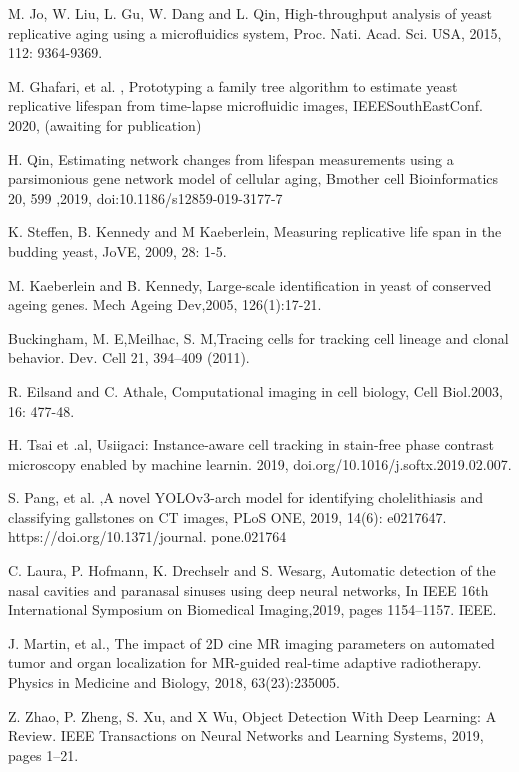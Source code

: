 \documentclass[conference]{IEEEtran}
\begin{document}
\begin{thebibliography}{00}
M. Jo, W. Liu, L. Gu, W. Dang and  L. Qin, High-throughput analysis of yeast replicative aging using a microfluidics system, Proc. Nati. Acad. Sci. USA, 2015, 112: 9364-9369.

M. Ghafari,  et al. , Prototyping a family tree algorithm to estimate yeast replicative lifespan from time-lapse microfluidic images, IEEESouthEastConf. 2020, (awaiting for publication)

H. Qin, Estimating network changes from lifespan measurements using a parsimonious gene network model of cellular aging, Bmother cell Bioinformatics 20, 599 ,2019, doi:10.1186/s12859-019-3177-7

K. Steffen, B. Kennedy and M Kaeberlein, Measuring replicative life span in the budding yeast, JoVE, 2009,  28: 1-5.

M. Kaeberlein and B. Kennedy, Large-scale identification in yeast of conserved ageing genes. Mech Ageing Dev,2005, 126(1):17-21.

Buckingham, M. E,Meilhac, S. M,Tracing cells for tracking cell lineage and clonal behavior. Dev. Cell 21, 394–409 (2011).

R. Eilsand and C. Athale, Computational imaging in cell biology, Cell Biol.2003, 16: 477-48.

H. Tsai et .al, Usiigaci: Instance-aware cell tracking in stain-free phase contrast microscopy enabled by machine learnin. 2019, doi.org/10.1016/j.softx.2019.02.007.

S. Pang,  et al. ,A novel YOLOv3-arch model for identifying cholelithiasis and classifying gallstones on CT images, PLoS ONE, 2019, 14(6): e0217647. https://doi.org/10.1371/journal. pone.021764

C.  Laura, P. Hofmann, K. Drechselr  and S. Wesarg, Automatic detection of the nasal cavities and paranasal sinuses using deep neural networks, In IEEE 16th International Symposium on Biomedical Imaging,2019, pages 1154–1157. IEEE.

J. Martin, et al., The impact of 2D cine MR imaging parameters on automated tumor and organ localization for MR-guided real-time adaptive radiotherapy. Physics in Medicine and Biology, 2018, 63(23):235005.

Z. Zhao, P. Zheng, S. Xu, and X Wu, Object Detection With Deep Learning: A Review. IEEE Transactions on Neural Networks and Learning Systems, 2019, pages 1–21.


\end{thebibliography}
\end{document}
